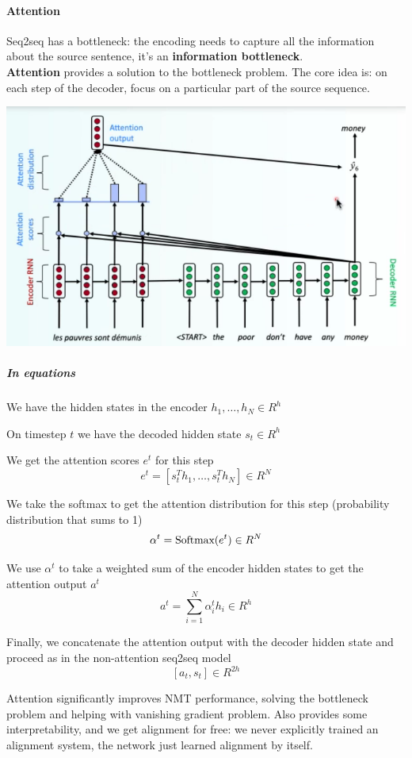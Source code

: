 \documentclass[10pt]{report}
\begin{document}
\paragraph{Attention} Seq2seq has a bottleneck: the encoding needs to capture all the information about the source sentence, it's an \textbf{information bottleneck}.\\
\textbf{Attention} provides a solution to the bottleneck problem. The core idea is: on each step of the decoder, focus on a particular part of the source sequence.
\begin{center}
	\includegraphics[scale=0.6]{67.png}
\end{center}
\subparagraph{In equations}\begin{list}{}{}
	\item We have the hidden states in the encoder $h_1,\ldots,h_N\in R^h$
	\item On timestep $t$ we have the decoded hidden state $s_t \in R^h$
	\item We get the attention scores $e^t$ for this step 
	$$e^t=[s_t^Th_1,\ldots,s_t^Th_N]\in R^N$$
	\item We take the softmax to get the attention distribution for this step (probability distribution that sums to 1)
	$$\alpha^t=\hbox{Softmax}(e^t) \in R^N$$
	\item We use $\alpha^t$ to take a weighted sum of the encoder hidden states to get the attention output $a^t$
	$$a^t = \sum_{i=1}^N \alpha_i^th_i\in R^h$$
	\item Finally, we concatenate the attention output with the decoder hidden state and proceed as in the non-attention seq2seq model
	$$[a_t, s_t]\in R^{2h}$$
\end{list}
Attention significantly improves NMT performance, solving the bottleneck problem and helping with vanishing gradient problem. Also provides some interpretability, and we get alignment for free: we never explicitly trained an alignment system, the network just learned alignment by itself.
\end{document}
